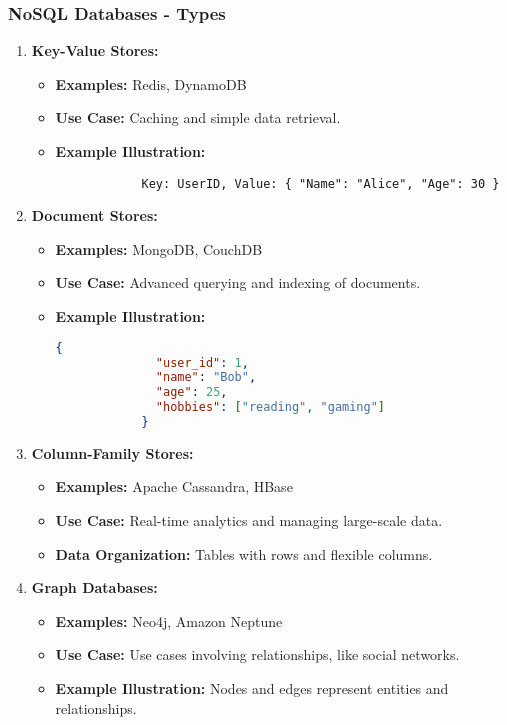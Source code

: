 \documentclass[aspectratio=169]{beamer}
\begin{document}
\begin{frame}[fragile]
    \frametitle{NoSQL Databases - Types}
    \begin{enumerate}
        \item \textbf{Key-Value Stores:}
        \begin{itemize}
            \item \textbf{Examples:} Redis, DynamoDB
            \item \textbf{Use Case:} Caching and simple data retrieval.
            \item \textbf{Example Illustration:}
            \begin{lstlisting}
            Key: UserID, Value: { "Name": "Alice", "Age": 30 }
            \end{lstlisting}
        \end{itemize}
        
        \item \textbf{Document Stores:}
        \begin{itemize}
            \item \textbf{Examples:} MongoDB, CouchDB
            \item \textbf{Use Case:} Advanced querying and indexing of documents.
            \item \textbf{Example Illustration:}
            \begin{lstlisting}[language=json]
            {
              "user_id": 1,
              "name": "Bob",
              "age": 25,
              "hobbies": ["reading", "gaming"]
            }
            \end{lstlisting}
        \end{itemize}
        
        \item \textbf{Column-Family Stores:}
        \begin{itemize}
            \item \textbf{Examples:} Apache Cassandra, HBase
            \item \textbf{Use Case:} Real-time analytics and managing large-scale data.
            \item \textbf{Data Organization:} Tables with rows and flexible columns.
        \end{itemize}
        
        \item \textbf{Graph Databases:}
        \begin{itemize}
            \item \textbf{Examples:} Neo4j, Amazon Neptune
            \item \textbf{Use Case:} Use cases involving relationships, like social networks.
            \item \textbf{Example Illustration:} Nodes and edges represent entities and relationships.
        \end{itemize}
    \end{enumerate}
\end{frame}
\end{document}
